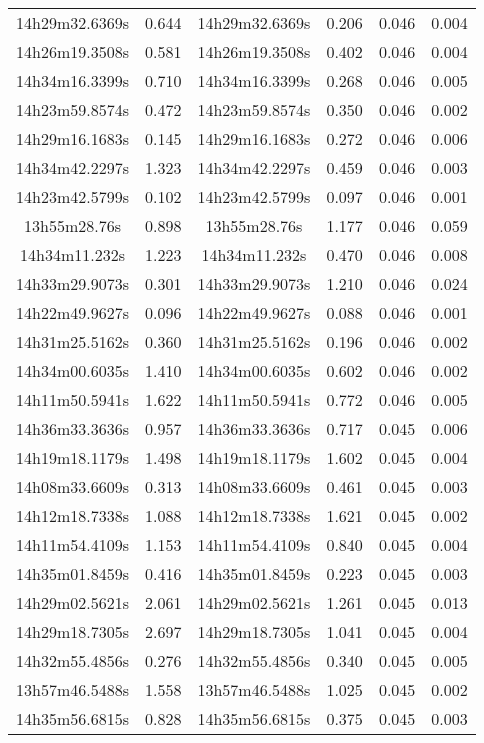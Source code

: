 \begin{table}
\begin{tabular}{cccccc}
14h29m32.6369s & 0.644 & 14h29m32.6369s & 0.206 & 0.046 & 0.004 \\
14h26m19.3508s & 0.581 & 14h26m19.3508s & 0.402 & 0.046 & 0.004 \\
14h34m16.3399s & 0.710 & 14h34m16.3399s & 0.268 & 0.046 & 0.005 \\
14h23m59.8574s & 0.472 & 14h23m59.8574s & 0.350 & 0.046 & 0.002 \\
14h29m16.1683s & 0.145 & 14h29m16.1683s & 0.272 & 0.046 & 0.006 \\
14h34m42.2297s & 1.323 & 14h34m42.2297s & 0.459 & 0.046 & 0.003 \\
14h23m42.5799s & 0.102 & 14h23m42.5799s & 0.097 & 0.046 & 0.001 \\
13h55m28.76s & 0.898 & 13h55m28.76s & 1.177 & 0.046 & 0.059 \\
14h34m11.232s & 1.223 & 14h34m11.232s & 0.470 & 0.046 & 0.008 \\
14h33m29.9073s & 0.301 & 14h33m29.9073s & 1.210 & 0.046 & 0.024 \\
14h22m49.9627s & 0.096 & 14h22m49.9627s & 0.088 & 0.046 & 0.001 \\
14h31m25.5162s & 0.360 & 14h31m25.5162s & 0.196 & 0.046 & 0.002 \\
14h34m00.6035s & 1.410 & 14h34m00.6035s & 0.602 & 0.046 & 0.002 \\
14h11m50.5941s & 1.622 & 14h11m50.5941s & 0.772 & 0.046 & 0.005 \\
14h36m33.3636s & 0.957 & 14h36m33.3636s & 0.717 & 0.045 & 0.006 \\
14h19m18.1179s & 1.498 & 14h19m18.1179s & 1.602 & 0.045 & 0.004 \\
14h08m33.6609s & 0.313 & 14h08m33.6609s & 0.461 & 0.045 & 0.003 \\
14h12m18.7338s & 1.088 & 14h12m18.7338s & 1.621 & 0.045 & 0.002 \\
14h11m54.4109s & 1.153 & 14h11m54.4109s & 0.840 & 0.045 & 0.004 \\
14h35m01.8459s & 0.416 & 14h35m01.8459s & 0.223 & 0.045 & 0.003 \\
14h29m02.5621s & 2.061 & 14h29m02.5621s & 1.261 & 0.045 & 0.013 \\
14h29m18.7305s & 2.697 & 14h29m18.7305s & 1.041 & 0.045 & 0.004 \\
14h32m55.4856s & 0.276 & 14h32m55.4856s & 0.340 & 0.045 & 0.005 \\
13h57m46.5488s & 1.558 & 13h57m46.5488s & 1.025 & 0.045 & 0.002 \\
14h35m56.6815s & 0.828 & 14h35m56.6815s & 0.375 & 0.045 & 0.003 \\

\end{tabular}
\end{table}
